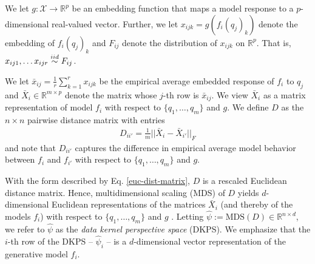

We let $ g: \mathcal{X} \to \mathbb{R}^{p} $ be an embedding function that maps a model response to a $p$-dimensional real-valued vector.
Further, we let $x_{ijk}=g(f_i(q_j)_k)$ denote the embedding of $ f_{i}(q_{j})_{k} $ and $ F_{ij} $ denote the distribution of $ x_{ijk} $ on $ \mathbb{R}^{p} $. 
That is, $x_{ij1},\dots x_{ijr} \overset{iid}{\sim}  F_{ij} $. 

We let $ \bar{x}_{ij} = \frac{1}{r} \sum_{k=1}^{r} x_{ijk} $ be the empirical average embedded response of $f_{i}$ to $q_{j}$ and $ \bar{X}_{i} \in \mathbb{R}^{m \times p}$ denote the matrix whose $ j $-th row is $ \bar{x}_{ij} $.
We view $ \bar{X}_{i} $ as a matrix representation of model $ f_{i} $ with respect to $ \{ q_1,\dots, q_m \}$ and $ g $. 
We define $ D $ as the $ n \times n $ pairwise distance matrix with entries 
\begin{align}
\label{euc-dist-matrix}
    D_{ii'} = \frac{1}{m} \big|\big| \bar{X}_{i} - \bar{X}_{i'} \big|\big|_{F}
\end{align} and note that $ D_{ii'} $ captures the difference in empirical average model behavior between $ f_{i} $ and $ f_{i'} $ with respect to $ \{q_{1}, \hdots, q_{m}\} $ and $ g $.

With the form described by Eq. \eqref{euc-dist-matrix}, $ D $ is a rescaled Euclidean distance matrix. 
Hence, multidimensional scaling (MDS) of $ D $ yields $ d $-dimensional Euclidean representations of the matrices $ \bar{X}_{i} $ (and thereby of the models $f_i$) with respect to $ \{q_{1}, \hdots, q_{m}\} $ and $ g $ \citep{torgerson1952multidimensional}.
Letting $ \widehat{\psi} := \text{MDS}(D) \in \mathbb{R}^{n \times d} $, we refer to $ \widehat{\psi} $ as the \textit{data kernel perspective space} (DKPS).
We emphasize that the $ i $-th row of the DKPS -- $ \widehat{\psi}_{i} $ -- is a $ d $-dimensional vector representation of the generative model $ f_{i} $.




